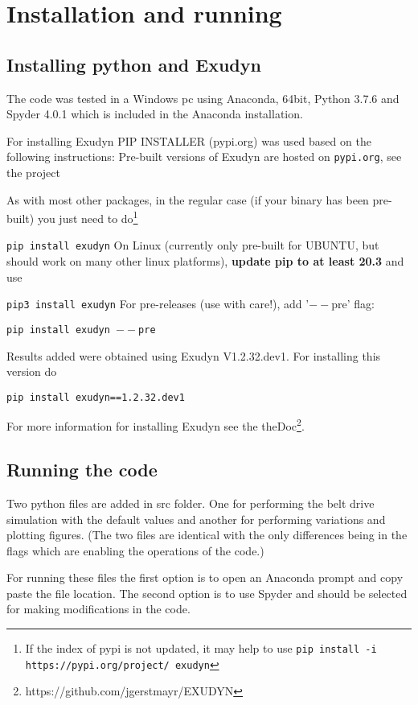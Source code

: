 \section{Installation and running}
\subsection{Installing python and Exudyn}
The code was tested in a Windows pc using Anaconda, 64bit, Python 3.7.6 and Spyder 4.0.1 which is included in the Anaconda installation.

For installing Exudyn PIP INSTALLER (pypi.org) was used based on the following instructions:
Pre-built versions of Exudyn are hosted on \texttt{pypi.org}, see the project
\bi
 \item {}
\ei
As with most other packages, in the regular case (if your binary has been pre-built) you just need to do\footnote{If the index of pypi is not updated, it may help to use \texttt{pip install -i https://pypi.org/project/ exudyn} }
\bi
  \item[] \texttt{pip install exudyn}
\ei
On Linux (currently only pre-built for UBUNTU, but should work on many other linux platforms), {\bf update pip to at least 20.3} and use 
\bi
  \item[] \texttt{pip3 install exudyn}
\ei
For pre-releases (use with care!), add '$--$pre' flag:
\bi
  \item[] \texttt{pip install exudyn $--$pre}
\ei  
  
Results added  
were obtained using Exudyn V1.2.32.dev1. For installing this version do
\bi
  \item[] \texttt{pip install exudyn==1.2.32.dev1}
\ei
             
For more information for installing Exudyn see the theDoc\footnote{https://github.com/jgerstmayr/EXUDYN}.
\subsection{Running the code}
Two python files are added in src folder. One for performing the belt drive simulation with the default values and another for performing variations and plotting figures. (The two files are identical with the only differences being in the flags which are enabling the operations of the code.)
 
For running these files the first option is to open an Anaconda prompt and copy paste the file location.
The second option is to use Spyder and should be selected for making modifications in the code. 
